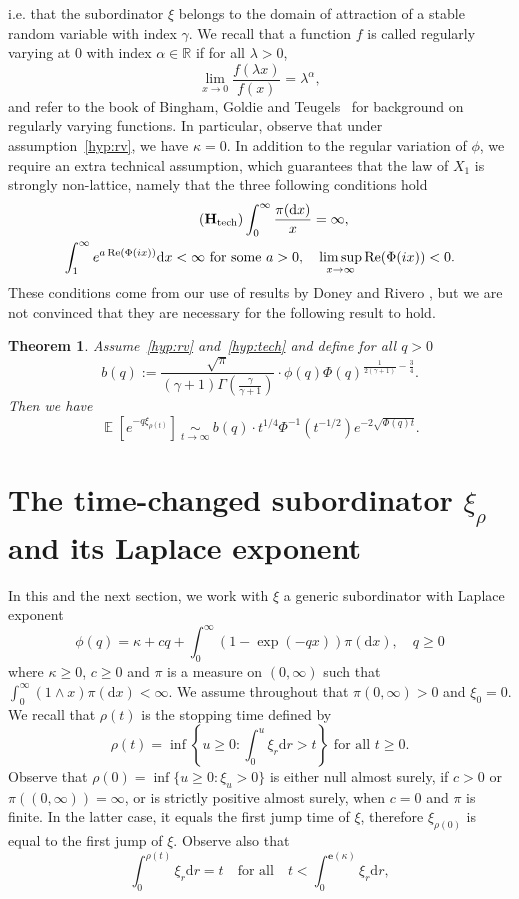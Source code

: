 \documentclass[10pt]{amsart}
\newtheorem{theo}{Theorem}[section]
\theoremstyle{definition}
\numberwithin{equation}{section}
\newcommand{\R}{\mathbb{R}}
\DeclareMathOperator{\E}{\mathbb{E}}
\newcommand{\dd}{\mathrm{d}}
\DeclareMathOperator{\Ree}{Re}
\newcommand{\bfe}{\mathbf{e}}
\newcommand{\htec}{\mathbf{H}_{\mathrm{tech}}}
\begin{document}
i.e. that the subordinator $\xi$ belongs to the domain of attraction of a stable random variable with index $\gamma$. We recall that a function $f$ is called regularly varying at $0$ with index $\alpha \in \R $ if for all $\lambda > 0$,
\[
\lim_{x \to 0} \frac{f(\lambda x)}{f(x)} = \lambda^\alpha,
\]
and refer to the book of Bingham, Goldie and Teugels~\cite{BGT} for background on regularly varying functions. In particular, observe that under assumption~\eqref{hyp:rv}, we have $\kappa = 0$. In addition to the regular variation of $\phi$, we require an extra technical assumption, which guarantees that the law of $X_1$ is strongly non-lattice, namely that the three following conditions hold
\begin{multline}\label{hyp:tech}
\tag{$\htec$}
\int_0^{\infty}\frac{\pi(\dd x)}{x}=\infty, \\ \int_{1}^{\infty}e^{a\Ree (\Phi(ix))}\dd x<\infty \text{ for some }a>0, \quad \limsup_{x \rightarrow \infty} \Ree (\Phi(ix)) <0.
\end{multline}
These conditions come from our use of results by Doney and Rivero \cite{DR13,DR16_err}, but we are not convinced that they are necessary for the following result to hold.
\begin{theo}\label{thm:asympBehavior}
Assume~\eqref{hyp:rv} and~\eqref{hyp:tech} and define for all $q > 0$
\begin{equation*}\label{eqn:defcq}
b(q) := \frac{\sqrt{\pi}}{(\gamma+1)\Gamma\left(\frac{\gamma}{\gamma + 1}\right)} \cdot \phi(q) \Phi(q)^{\frac{1}{2(\gamma + 1)} - \frac{3}{4}}.
\end{equation*}
Then we have
\[
\E\left[e^{-q \xi_{\rho(t)}}\right]~\underset{t \to \infty} \sim~b(q)\cdot t^{1/4} \Phi^{-1}\left(t^{-1/2}\right) e^{-2 \sqrt{\Phi(q)t}}.
\]
\end{theo}
\section{The time-changed subordinator \texorpdfstring{$\xi_{\rho}$}{xiRho} and its Laplace exponent}\label{sec:Laplace}

In this and the next section, we work with $\xi$ a generic subordinator with Laplace exponent
\[
\phi(q)=\kappa+cq+\int_0^{\infty} \left(1-\exp(-qx)\right)\pi(\dd x), \quad q \geq 0
\]
where $\kappa \geq 0$, $c \geq 0$ and $\pi$ is a measure on $(0,\infty)$ such that $\int_0^{\infty} (1 \wedge x) \pi(\dd x)<\infty$. We assume throughout that $\pi(0,\infty)>0$ and $\xi_0=0$. We recall that $\rho(t)$ is the stopping time defined by
\begin{equation}\label{eq:time_change}
\rho(t)=\inf \left\{u \geq 0 : \int_0^u \xi_r \dd r >t \right\} \text{ for all }t\geq 0.
\end{equation}
Observe that $\rho(0) = \inf\{u \geq 0 : \xi_u > 0\}$ is either null almost surely, if $c > 0$ or $\pi((0,\infty)) = \infty$, or is strictly positive almost surely, when $c=0$ and $\pi$ is finite. In the latter case, it equals the first jump time of $\xi$, therefore $\xi_{\rho(0)}$ is equal to the first jump of $\xi$. Observe also that
\[
\int_0^{\rho(t)} \xi_r \dd r =t \quad \text{for all} \quad t <\int_0^{\bfe(\kappa)}\xi_r \dd r,
\]
\end{document}
